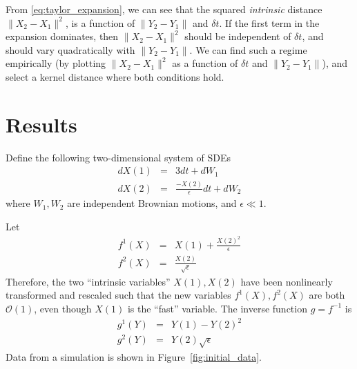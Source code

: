 \documentclass[1p]{elsarticle}
\begin{document}
From \eqref{eq:taylor_expansion}, we can see that the squared {\em intrinsic} distance $\| X_2 - X_1 \|^2$, is a function of $\|Y_2 - Y_1\|$ and $\delta t$. 
%
If the first term in the expansion dominates, then $\|X_2 - X_1 \|^2$ should be independent of $\delta t$, and should vary quadratically with $\| Y_2 - Y_1\|$. 
%
We can find such a regime empirically (by plotting $\| X_2 - X_1 \|^2$ as a function of $\delta t$ and $\|Y_2 - Y_1\|$), and select a kernel distance where both conditions hold.

\section{Results}
 
Define the following two-dimensional system of SDEs
\begin{eqnarray} \label{eq:init_data}
dX(1) &=& 3 dt + dW_1 \\ 
dX(2) &=& \frac{-X(2)}{\epsilon} dt + dW_2 
\end{eqnarray}
where $W_1, W_2$ are independent Brownian motions, and $\epsilon \ll 1$.
%

Let
\begin{eqnarray}\label{eq:transformed_data}
f^1(X) &=& X(1) + \frac{ X(2)^2}{\epsilon} \\
f^2(X) &=& \frac{X(2)}{\sqrt{\epsilon}}
\end{eqnarray}
Therefore, the two ``intrinsic variables'' $X(1), X(2)$ have been nonlinearly transformed and rescaled such that the new variables $f^1(X), f^2(X)$ are both $\mathcal{O}(1)$, even though $X(1)$ is the ``fast'' variable. 
%
The inverse function $g = f^{-1}$ is
\begin{eqnarray}
g^1(Y) &=& Y(1) - Y(2)^2 \\
g^2(Y) &=& Y(2) \sqrt{\epsilon}
\end{eqnarray}
%
Data from a simulation is shown in Figure~\ref{fig:initial_data}.
\end{document}
